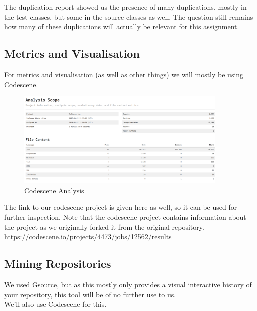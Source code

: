 \documentclass{article}
\begin{document}
The duplication report showed us the presence of many duplications, mostly in the test classes, but some in the source classes as well. The question still remains how many of these duplications will actually be relevant for this assignment.

\subsection{Metrics and Visualisation}

For metrics and visualisation (as well as other things) we will mostly be using Codescene.

\begin{figure}[H]
\centering
	\includegraphics[width=0.9\textwidth]{codescene_analysis.png}
	\caption{Codescene Analysis}
\end{figure}


The link to our codescene project is given here as well, so  it can be used for further inspection. Note that the codescene project contains information about the project as we originally forked it from the original repository.\\

\noindent
https://codescene.io/projects/4473/jobs/12562/results

\newpage
\subsection{Mining Repositories}

We used Gsource, but as this mostly only provides a visual interactive history of your repository, this tool will be of no further use to us.\\

\noindent
We'll also use Codescene for this.
\end{document}

